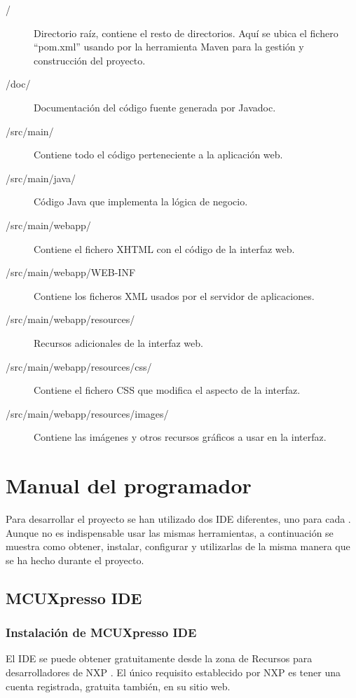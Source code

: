 \begin{description}
  \item[/] Directorio raíz, contiene el resto de directorios. Aquí se ubica el
  fichero ``pom.xml'' usando por la herramienta Maven para la gestión y
  construcción del proyecto.
  \item[/doc/] Documentación del código fuente generada por Javadoc.
  \item[/src/main/] Contiene todo el código perteneciente a la aplicación web.
  \item[/src/main/java/] Código Java que implementa la lógica de negocio.
  \item[/src/main/webapp/] Contiene el fichero XHTML con el código de la
  interfaz web.
  \item[/src/main/webapp/WEB-INF] Contiene los ficheros XML usados por
  el servidor de aplicaciones.
  \item[/src/main/webapp/resources/] Recursos adicionales de la interfaz web.
  \item[/src/main/webapp/resources/css/] Contiene el fichero CSS que modifica el
  aspecto de la interfaz.
  \item[/src/main/webapp/resources/images/] Contiene las imágenes y otros
  recursos gráficos a usar en la interfaz.
\end{description}



\section{Manual del programador}
Para desarrollar el proyecto se han utilizado dos IDE diferentes, uno para cada
\sw{}. Aunque no es indispensable usar las mismas herramientas, a continuación
se muestra como obtener, instalar, configurar y utilizarlas de la misma
manera que se ha hecho durante el proyecto.


\subsection{MCUXpresso IDE} \label{sec:man-dev-mcuxpresso}

\subsubsection{Instalación de MCUXpresso IDE} \label{sec:instalacion-mcu}
El IDE se puede obtener gratuitamente desde la zona de Recursos para
desarrolladores de NXP \cite{webpage:mcuxpresso-ide}. El único requisito
establecido por NXP es tener una cuenta registrada, gratuita también, en su
sitio web.

